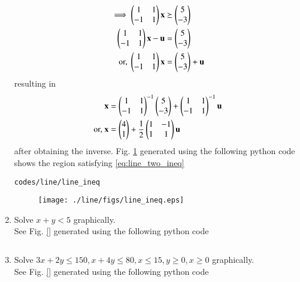 \begin{enumerate}[label=\arabic*.,ref=\thesubsection.\theenumi]
\begin{align}
\implies 
\begin{pmatrix}1 & 1 \\ -1 & 1\end{pmatrix}\mathbf{x}  &\succeq \begin{pmatrix}5\\-3\end{pmatrix}
\\
\begin{pmatrix}1 & 1 \\ -1 & 1\end{pmatrix}\mathbf{x}  -\mathbf{u}&=\begin{pmatrix}5\\-3\end{pmatrix}
\\
\text{or, }
\begin{pmatrix}1 & 1 \\ -1 & 1\end{pmatrix}\mathbf{x} &= \begin{pmatrix}5\\-3\end{pmatrix} +\mathbf{u}
\end{align}
%
resulting in 
\begin{align}
\mathbf{x} &= \begin{pmatrix}1 & 1 \\ -1 & 1\end{pmatrix}^{-1}\begin{pmatrix}5\\-3\end{pmatrix} +\begin{pmatrix}1 & 1 \\ -1 & 1\end{pmatrix}^{-1}\mathbf{u}
\\
\text{or, } \mathbf{x} &= \begin{pmatrix}4\\1\end{pmatrix} +\frac{1}{2}\begin{pmatrix}1 & -1 \\ 1 & 1\end{pmatrix}\mathbf{u}
\end{align}
%
after obtaining the  inverse.
%
 Fig. \ref{fig:line_ineq} generated using the following python code shows the region satisfying \eqref{eq:line_two_ineq}

\begin{lstlisting}
codes/line/line_ineq
\end{lstlisting}
%
\begin{figure}[!ht]
\texttt{[image: ./line/figs/line\_ineq.eps]}
\caption{}
\label{fig:line_ineq}
\end{figure}
%
\item   Solve    $x+y < 5$ graphically.
\\
\solution  See Fig. \ref{} generated using the following python code
\begin{lstlisting}
\end{lstlisting}
%
    \item Solve $3x+2y \leq 150, x+4y \leq 80, x \leq 15, y \geq 0,
    x \geq 0$ graphically.    
\\
\solution  
See Fig. \ref{} generated using the following python code
\begin{lstlisting}
\end{lstlisting}
   
    \end{enumerate}
